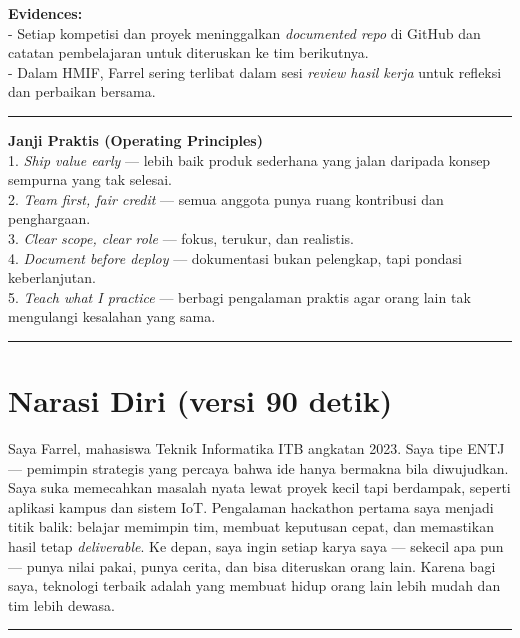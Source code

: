 \documentclass[
  letterpaper,
  DIV=11,
  numbers=noendperiod]{scrreprt}
\begin{document}
\textbf{Evidences:}\\
- Setiap kompetisi dan proyek meninggalkan \emph{documented repo} di
GitHub dan catatan pembelajaran untuk diteruskan ke tim berikutnya.\\
- Dalam HMIF, Farrel sering terlibat dalam sesi \emph{review hasil
kerja} untuk refleksi dan perbaikan bersama.

\begin{center}\rule{0.5\linewidth}{0.5pt}\end{center}

\textbf{Janji Praktis (Operating Principles)}\\
1. \emph{Ship value early} --- lebih baik produk sederhana yang jalan
daripada konsep sempurna yang tak selesai.\\
2. \emph{Team first, fair credit} --- semua anggota punya ruang
kontribusi dan penghargaan.\\
3. \emph{Clear scope, clear role} --- fokus, terukur, dan realistis.\\
4. \emph{Document before deploy} --- dokumentasi bukan pelengkap, tapi
pondasi keberlanjutan.\\
5. \emph{Teach what I practice} --- berbagi pengalaman praktis agar
orang lain tak mengulangi kesalahan yang sama.

\begin{center}\rule{0.5\linewidth}{0.5pt}\end{center}

\section{Narasi Diri (versi 90 detik)}\label{narasi-diri-versi-90-detik}

Saya Farrel, mahasiswa Teknik Informatika ITB angkatan 2023. Saya tipe
ENTJ --- pemimpin strategis yang percaya bahwa ide hanya bermakna bila
diwujudkan. Saya suka memecahkan masalah nyata lewat proyek kecil tapi
berdampak, seperti aplikasi kampus dan sistem IoT. Pengalaman hackathon
pertama saya menjadi titik balik: belajar memimpin tim, membuat
keputusan cepat, dan memastikan hasil tetap \emph{deliverable}. Ke
depan, saya ingin setiap karya saya --- sekecil apa pun --- punya nilai
pakai, punya cerita, dan bisa diteruskan orang lain. Karena bagi saya,
teknologi terbaik adalah yang membuat hidup orang lain lebih mudah dan
tim lebih dewasa.

\begin{center}\rule{0.5\linewidth}{0.5pt}\end{center}
\end{document}

